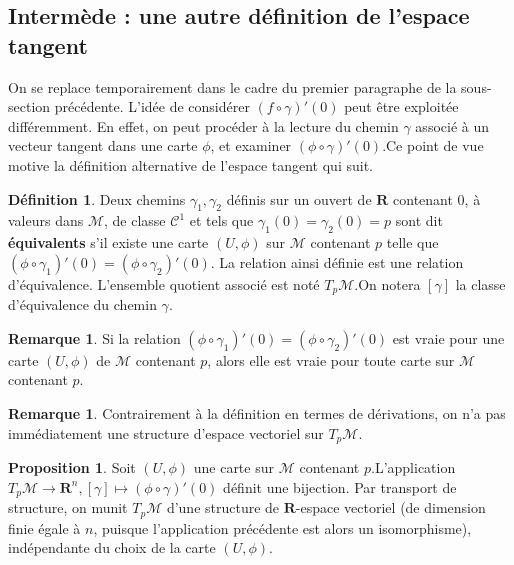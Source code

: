 \documentclass[12pt,a4paper]{article}
\theoremstyle{definition}
\newtheorem{prop}[thm]{Proposition}
\newtheorem{defn}[thm]{Définition}
\newtheorem{rqe}[thm]{Remarque}
\begin{document}
\subsection{Intermède : une autre définition de l'espace tangent}
On se replace temporairement dans le cadre du premier paragraphe de la sous-section précédente.\newline 
L'idée de considérer $(f\circ \gamma)'(0)$ peut être exploitée différemment. En effet, on peut procéder à la lecture du chemin $\gamma$ associé à un vecteur tangent dans une carte $\phi$, et examiner $(\phi\circ\gamma)'(0)$.\newline Ce point de vue motive la définition alternative de l'espace tangent qui suit.
\begin{defn}
Deux chemins $\gamma_1,\gamma_2$ définis sur un ouvert de $\mathbf{R}$ contenant $0$, à valeurs dans $\mathcal{M}$, de classe $\mathcal{C}^1$ et tels que $\gamma_1(0)=\gamma_2(0)=p$ sont dit \textbf{équivalents} s'il existe une carte $(U,\phi)$ sur $\mathcal{M}$ contenant $p$ telle que $(\phi\circ\gamma_1)'(0)=(\phi\circ\gamma_2)'(0)$. La relation ainsi définie est une relation d'équivalence. L'ensemble quotient associé est noté $T_p\mathcal{M}$.\newline On notera $[\gamma]$ la classe d'équivalence du chemin $\gamma$.
\end{defn}
\begin{rqe}
Si la relation $(\phi\circ\gamma_1)'(0)=(\phi\circ\gamma_2)'(0)$ est vraie pour une carte $(U,\phi)$ de $\mathcal{M}$ contenant $p$, alors elle est vraie pour toute carte sur $\mathcal{M}$ contenant $p$. 
\end{rqe}
\begin{rqe}
Contrairement à la définition en termes de dérivations, on n'a pas immédiatement une structure d'espace vectoriel sur $T_p\mathcal{M}$.
\end{rqe}
\begin{prop}
Soit $(U,\phi)$ une carte sur $\mathcal{M}$ contenant $p$.\newline L'application $T_p\mathcal{M}\to\mathbf{R}^n,[\gamma]\mapsto(\phi\circ\gamma)'(0)$ définit une bijection. Par transport de structure, on munit $T_p\mathcal{M}$ d'une structure de $\mathbf{R}$-espace vectoriel (de dimension finie égale à $n$, puisque l'application précédente est alors un isomorphisme), indépendante du choix de la carte $(U,\phi)$.
\end{prop}
\end{document}
